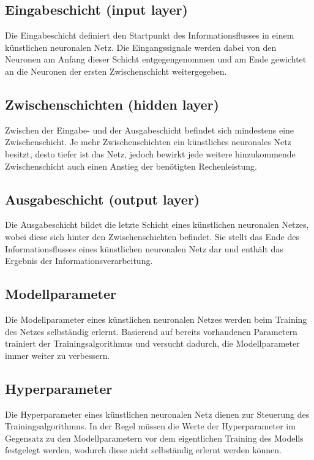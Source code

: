 \subsection{Eingabeschicht (input layer)}
	
	Die Eingabeschicht definiert den Startpunkt des Informationsflusses in einem künstlichen neuronalen Netz. Die Eingangssignale werden dabei von den Neuronen am Anfang dieser Schicht entgegengenommen und am Ende gewichtet an die Neuronen der ersten Zwischenschicht weitergegeben. \cite{jaai}
	
\subsection{Zwischenschichten (hidden layer)}

	Zwischen der Eingabe- und der Ausgabeschicht befindet sich mindestens eine Zwischenschicht. Je mehr Zwischenschichten ein künstliches neuronales Netz besitzt, desto tiefer ist das Netz, jedoch bewirkt jede weitere hinzukommende Zwischenschicht auch einen Anstieg der benötigten Rechenleistung. \cite{jaai}
	
\subsection{Ausgabeschicht (output layer)}

	Die Ausgabeschicht bildet die letzte Schicht eines künstlichen neuronalen Netzes, wobei diese sich hinter den Zwischenschichten befindet. Sie stellt das Ende des Informationsflusses eines künstlichen neuronalen Netz dar und enthält das Ergebnis der Informationsverarbeitung. \cite{jaai}
	
\subsection{Modellparameter}

Die Modellparameter eines künstlichen neuronalen Netzes werden beim Training des Netzes selbständig erlernt. Basierend auf bereits vorhandenen Parametern trainiert der Trainingsalgorithmus und versucht dadurch, die Modellparameter immer weiter zu verbessern. \cite{divis}

\subsection{Hyperparameter}

Die Hyperparameter eines künstlichen neuronalen Netz dienen zur Steuerung des Trainingsalgorithmus. In der Regel müssen die Werte der Hyperparameter im Gegensatz zu den Modellparametern vor dem eigentlichen Training des Modells festgelegt werden, wodurch diese nicht selbständig erlernt werden können. \cite{wiki} \\

